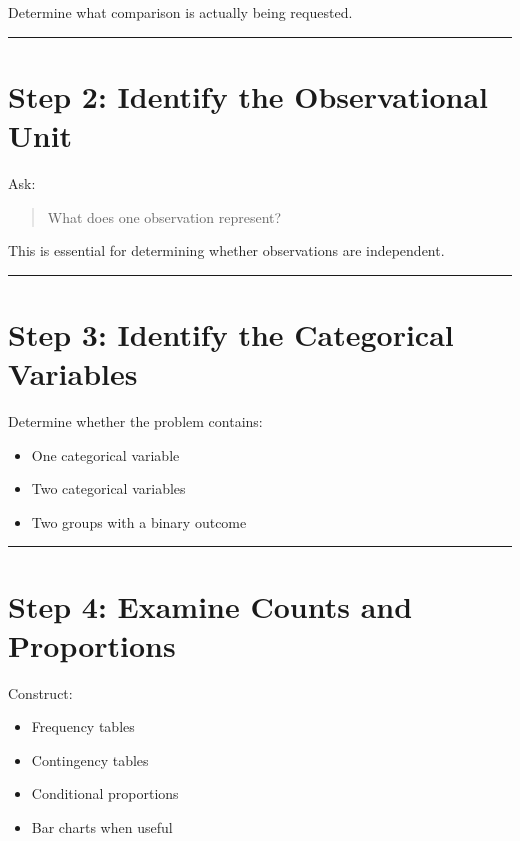 \documentclass[
  letterpaper,
  DIV=11,
  numbers=noendperiod]{scrreprt}
\providecommand{\tightlist}{%
  \setlength{\itemsep}{0pt}\setlength{\parskip}{0pt}}
\begin{document}
Determine what comparison is actually being requested.

\begin{center}\rule{0.5\linewidth}{0.5pt}\end{center}

\section{Step 2: Identify the Observational
Unit}\label{step-2-identify-the-observational-unit}

Ask:

\begin{quote}
What does one observation represent?
\end{quote}

This is essential for determining whether observations are independent.

\begin{center}\rule{0.5\linewidth}{0.5pt}\end{center}

\section{Step 3: Identify the Categorical
Variables}\label{step-3-identify-the-categorical-variables}

Determine whether the problem contains:

\begin{itemize}
\tightlist
\item
  One categorical variable
\item
  Two categorical variables
\item
  Two groups with a binary outcome
\end{itemize}

\begin{center}\rule{0.5\linewidth}{0.5pt}\end{center}

\section{Step 4: Examine Counts and
Proportions}\label{step-4-examine-counts-and-proportions-1}

Construct:

\begin{itemize}
\tightlist
\item
  Frequency tables
\item
  Contingency tables
\item
  Conditional proportions
\item
  Bar charts when useful
\end{itemize}
\end{document}
